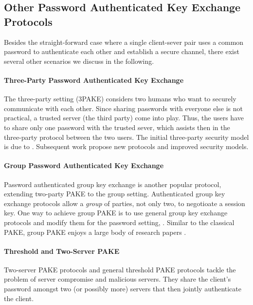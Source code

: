\subsection{Other Password Authenticated Key Exchange Protocols}
Besides the straight-forward case where a single client-sever pair uses a common password to authenticate each other and establish a secure channel, there exist several other scenarios we discuss in the following.

\paragraph{Three-Party Password Authenticated Key Exchange}
The three-party setting (3\ac{PAKE}) considers two humans who want to securely communicate with each other.
Since sharing passwords with everyone else is not practical, a trusted server (the third party) come into play.
Thus, the users have to share only one password with the trusted sever, which assists then in the three-party protocol between the two users.
The initial three-party security model is due to \citeauthor{Abdalla2005} \cite{Abdalla2005}.
Subsequent work \cite{CliffTB06,Yoneyama08,TsaiC13} propose new protocols and improved security models.

\paragraph{Group Password Authenticated Key Exchange}
Password authenticated group key exchange is another popular protocol, extending two-party \ac{PAKE} to the group setting.
Authenticated group key exchange protocols allow a \emph{group} of parties, not only two, to negotioate a session key.
One way to achieve group \ac{PAKE} is to use general group key exchange protocols and modify them for the password setting, \eg \cite{Bresson02,BrChPo05}.
Similar to the classical \ac{PAKE}, group \ac{PAKE} enjoys a large body of research papers \cite{Kim2004,Abdalla2006,Bohli2006,Dutta2006,AbdallaP06,AbdallaBVS07,AbdallaCCP09,AbdallaCGP11}.

\paragraph{Threshold and Two-Server PAKE}
Two-server PAKE protocols \cite{Abdalla2005} and general threshold \ac{PAKE} protocols \cite{MacKenzieSJ02,RaimondoG03,Abdalla2005b} tackle the problem of server compromise and malicious servers.
They share the client's password amongst two (or possibly more) servers that then jointly authenticate the client.

